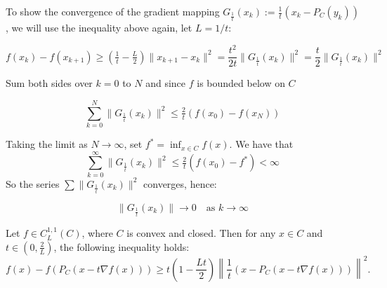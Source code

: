 \documentclass{ExerciseSheet}
\begin{document}
\begin{solution}
To show the convergence of the gradient mapping $G_{\tfrac{1}{t}}(x_k) := \tfrac{1}{t}(x_k -P_C(y_k)) $, we will use the inequality above again, let $L =1/t$:

\[
f(x_k) - f(x_{k+1}) \ge \left(   \tfrac{1}{t} - \tfrac{L}{2}  \right) \|x_{k+1} - x_k\|^2 = \frac{t^2}{2t} \|G_{\tfrac{1}{t}}(x_k)\|^2 = \frac{t}{2} \|G_{\tfrac{1}{t}}(x_k)\|^2
\]

Sum both sides over $k = 0$ to $N$ and since $f$ is bounded below on $C$

\[
\sum_{k=0}^N \|G_{\tfrac{1}{t}}(x_k)\|^2 \le \tfrac{2}{t} (f(x_0) - f(x_N))
\]

Taking the limit as $N \rightarrow \infty$, set $f^* = \inf_{x \in C} f(x)$. We have that 
\[
\sum_{k=0}^\infty \|G_{\tfrac{1}{t}}(x_k)\|^2 \le \tfrac{2}{t} (f(x_0) - f^*) < \infty
\]
So the series $\sum \|G_{\tfrac{1}{t}}(x_k)\|^2$ converges, hence:

\[
\|G_{\tfrac{1}{t}}(x_k)\| \to 0 \quad \text{as } k \to \infty
\]

\end{solution}
\fi
\begin{problem}
    Let $ f \in C_L^{1,1}(C) $, where $ C $ is convex and closed. Then for any $ x \in C $ and $ t \in \left(0, \frac{2}{L}\right) $, the following inequality holds:
\begin{equation}\label{eq:descent-pgd}
f(x) - f(P_C(x - t \nabla f(x))) \geq t \left(1 - \frac{Lt}{2}\right) \left\| \frac{1}{t}(x - P_C(x - t \nabla f(x))) \right\|^2.
\end{equation}
\end{problem}
\end{document}
